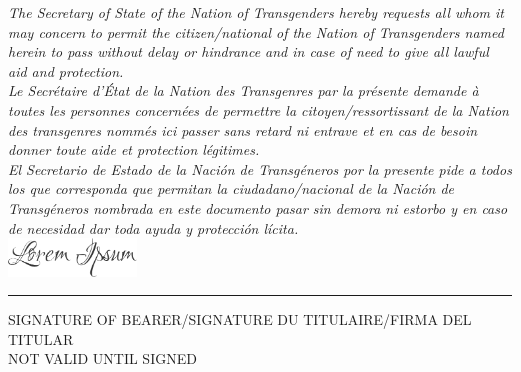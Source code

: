 \newpage
{}
\begin{landscape}
    \begin{center}
        \begin{minipage}{0.8\linewidth}
            \itshape\selectfont
            \centering
            \scriptsize
            The Secretary of State of the Nation of Transgenders hereby requests all whom it may concern to permit the citizen/national of the Nation of Transgenders named herein to pass without delay or hindrance and in case of need to give all lawful aid and protection.\\
            \vspace{0.2in}
            Le Secrétaire d'État de la Nation des Transgenres par la présente demande à toutes les personnes concernées de permettre la citoyen/ressortissant de la Nation des transgenres nommés ici passer sans retard ni entrave et en cas de besoin donner toute aide et protection légitimes.\\
            \vspace{0.2in}
            El Secretario de Estado de la Nación de Transgéneros por la presente pide a todos los que corresponda que permitan la ciudadano/nacional de la Nación de Transgéneros nombrada en este documento pasar sin demora ni estorbo y en caso de necesidad dar toda ayuda y protección lícita.\\
            \vspace{0.1in}
            \includegraphics[height=0.4in]{images/signature.png}
            \vspace{-0.1in}
        \end{minipage}
        \hrule
        \vspace{0.1in}
        \tiny
        SIGNATURE OF BEARER/SIGNATURE DU TITULAIRE/FIRMA DEL TITULAR
        \\
        \vspace{0.1in}
        {\sffamily \footnotesize \color{Blue} NOT VALID UNTIL SIGNED}
    \end{center}
\end{landscape}
\restoregeometry